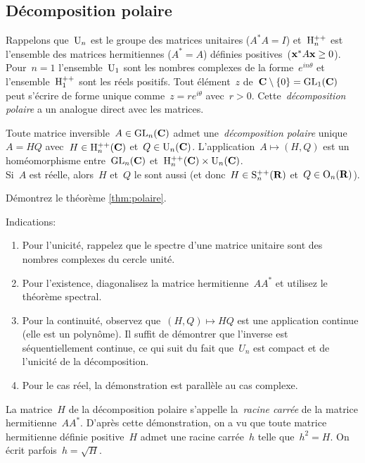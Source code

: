 \subsection{Décomposition polaire}

Rappelons que~$\mathrm{U}_n$ est le groupe des matrices unitaires ($A^*A=I$)
et~$\mathrm{H}_n^{++}$ est l'ensemble des matrices hermitiennes ($A^*=A$) définies
positives~($\mathbf{x}^*A\mathbf{x}\ge 0$).  Pour~$n=1$ l'ensemble~$\mathrm{U}_1$ sont les nombres
complexes de la forme~$e^{in\theta}$ et l'ensemble~$\mathrm{H}_1^{++}$ sont les réels
positifs.  Tout élément~$z$ de~$\mathbf{C}\setminus\{0\}=\mathrm{GL}_1(\mathbf{C})$ peut s'écrire de
forme unique comme~$z=re^{i\theta}$ avec~$r>0$.  Cette~\emph{décomposition
polaire} a un analogue direct avec les matrices.

\begin{theorem}
	\label{thm:polaire}
	Toute matrice inversible~$A\in\mathrm{GL}_n(\mathbf{C})$ admet une~\emph{décomposition
	polaire}
	unique~$A=HQ$ avec~$H\in\mathrm{H}_n^{++}(\mathbf{C})$ et~$Q\in\mathrm{U}_n(\mathbf{C})$.
	L'application~$A\mapsto(H,Q)$ est un homéomorphisme entre~$\mathrm{GL}_n(\mathbf{C})$
	et~$\mathrm{H}_n^{++}(\mathbf{C})\times\mathrm{U}_n(\mathbf{C})$.\\
	Si~$A$ est réelle, alors~$H$ et~$Q$ le sont
	aussi (et donc~$H\in\mathrm{S}^{++}_n(\mathbf{R})$ et~$Q\in\mathrm{O}_n(\mathbf{R})$).
\end{theorem}

\begin{exercice}
	Démontrez le théorème \ref{thm:polaire}.
\end{exercice}
\vspace{-1em}
Indications:
\begin{enumerate}
	\item Pour l'unicité, rappelez que le spectre d'une matrice
		unitaire sont des nombres complexes du cercle unité.
	\item Pour l'existence, diagonalisez la matrice hermitienne~$AA^*$ et
		utilisez le théorème spectral.
	\item Pour la continuité, observez que~$(H,Q)\mapsto HQ$ est une
		application continue (elle est un polynôme).  Il suffit de démontrer
		que l'inverse est séquentiellement continue, ce qui suit du fait
		que~$U_n$ est compact et de l'unicité de la décomposition.
	\item Pour le cas réel, la démonstration est parallèle au cas complexe.
\end{enumerate}

La matrice~$H$ de la décomposition polaire s'appelle la~\emph{racine carrée}
de la matrice hermitienne~$AA^*$.  D'après cette démonstration, on a vu que
toute matrice hermitienne définie positive~$H$ admet une racine carrée~$h$
telle que~$h^2=H$.  On écrit parfois~$h=\sqrt H$.

